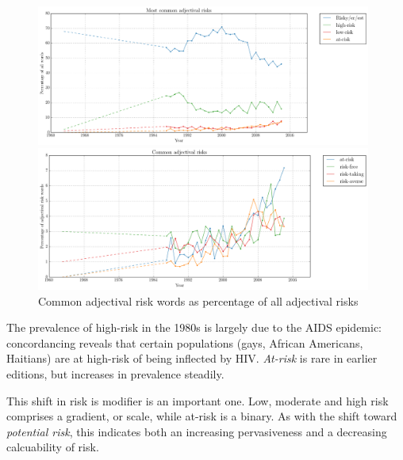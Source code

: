             \noindent
          \begin{figure}[htb!]
          \centering
          \begin{minipage}{.48\textwidth}
            \centering
            \includegraphics[width=0.98\textwidth]{../images/most_common_adjectival_risks.png}
          \end{minipage}%
          \begin{minipage}{.48\textwidth}
            \centering
            \includegraphics[width=0.98\textwidth]{../images/common_adjectival_risks.png}
           \end{minipage}
           \caption{Common adjectival risk words as percentage of all adjectival risks}
                \label{fig:adjtraj}
          \end{figure}

    

			The prevalence of high-risk in the 1980s is largely due to the AIDS epidemic: concordancing reveals that certain populations (gays, African Americans, Haitians) are at high-risk of being inflected by HIV. \emph{At-risk} is rare in earlier editions, but increases in prevalence steadily.

			This shift in risk is modifier is an important one. Low, moderate and high risk comprises a gradient, or scale, while at-risk is a binary. As with the shift toward \emph{potential risk}, this indicates both an increasing pervasiveness and a decreasing calcuability of risk. %
			
